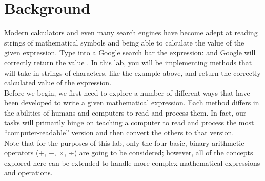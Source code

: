 	\blankpage

	\thispagestyle{empty}
	\tableofcontents

	\pagebreak

	\section{Background}
		Modern calculators and even many search engines have become adept at reading strings of mathematical symbols and being able to calculate the value of the given expression. Type into a Google search bar the expression:  and Google will correctly return the value . In this lab, you will be implementing methods that will take in strings of characters, like the example above, and return the correctly calculated value of the expression.\\[\baselineskip]
		Before we begin, we first need to explore a number of different ways that have been developed to write a given mathematical expression. Each method differs in the abilities of humans and computers to read and process them. In fact, our tasks will primarily hinge on teaching a computer to read and process the most ``computer-readable'' version and then convert the others to that version.\\[\baselineskip]
		Note that for the purposes of this lab, only the four basic, binary arithmetic operators ($+$, $-$, $\times$, $\div$) are going to be considered; however, all of the concepts explored here can be extended to handle more complex mathematical expressions and operations.

